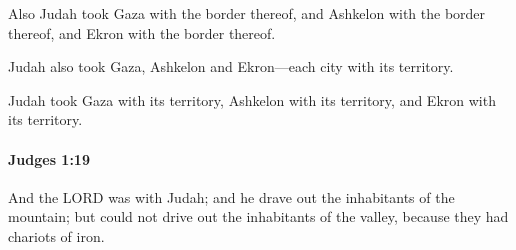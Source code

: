 			\begin{versebox}
					\item[BHS] 
					\item[ASV] Also Judah took Gaza with the border thereof, and Ashkelon with the border thereof, and Ekron with the border thereof.
					\item[NIV] Judah also took Gaza, Ashkelon and Ekron—each city with its territory.
					\item[NRSV] Judah took Gaza with its territory, Ashkelon with its territory, and Ekron with its territory.
			\end{versebox}

		\paragraph{Judges 1:19} %
			\label{JUDGES-1-19}

			And the LORD was with Judah; and he drave out the inhabitants of the mountain; but could not drive out the inhabitants of the valley, because they had chariots of iron.

